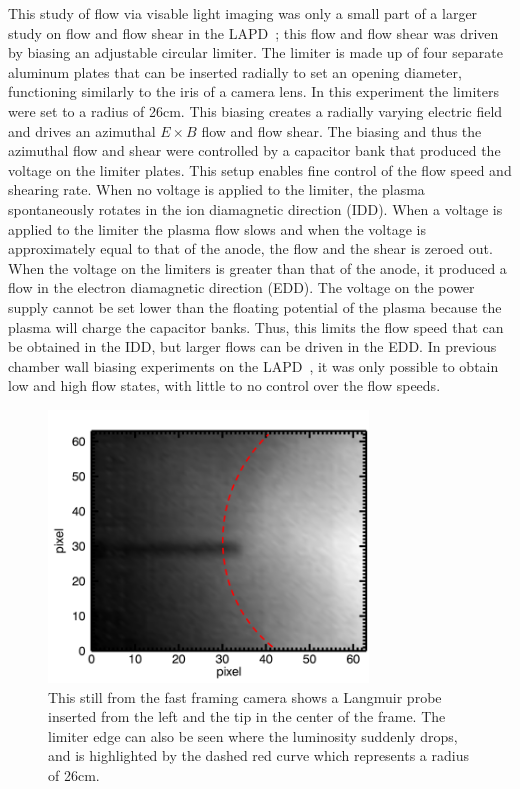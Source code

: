 \documentclass[%
 reprint,
 amsmath,amssymb,
 aps,
]{revtex4-1}
\begin{document}
This study of flow via visable light imaging was only a small part of a larger study on flow and flow shear in the LAPD~\cite{schaffner12, schaffner13}; this flow and flow shear was driven by biasing an adjustable circular limiter. The limiter is made up of four separate aluminum plates that can be inserted radially to set an opening diameter, functioning similarly to the iris of a camera lens. In this experiment the limiters were set to a radius of 26cm. This biasing creates a radially varying electric field and drives an azimuthal $E \times B$ flow and flow shear. The biasing and thus the azimuthal flow and shear were controlled by a capacitor bank that produced the voltage on the limiter plates. This setup enables fine control of the flow speed and shearing rate. When no voltage is applied to the limiter, the plasma spontaneously rotates in the ion diamagnetic direction (IDD).  When a voltage is applied to the limiter the plasma flow slows and when the voltage is approximately equal to that of the anode, the flow and the shear is zeroed out.  When the voltage on the limiters is greater than that of the anode, it produced a flow in the electron diamagnetic direction (EDD). The voltage on the power supply cannot be set lower than the floating potential of the plasma because the plasma will charge the capacitor banks. Thus, this limits the flow speed that can be obtained in the IDD, but larger flows can be driven in the EDD. In previous chamber wall biasing experiments on the LAPD~\cite{Carter09}, it was only possible to obtain low and high flow states, with little to no control over the flow speeds.


\begin{figure}[!htbp]
\centerline{}
\includegraphics[width=8.5cm]{plot_movie_still}
\caption{\label{fig:plot_movie_still} This still from the fast framing camera shows a Langmuir probe inserted from the left and the tip in the center of the frame. The limiter edge can also be seen where the luminosity suddenly drops, and is highlighted by the dashed red curve which represents a radius of 26cm.}
\end{figure}
\end{document}
